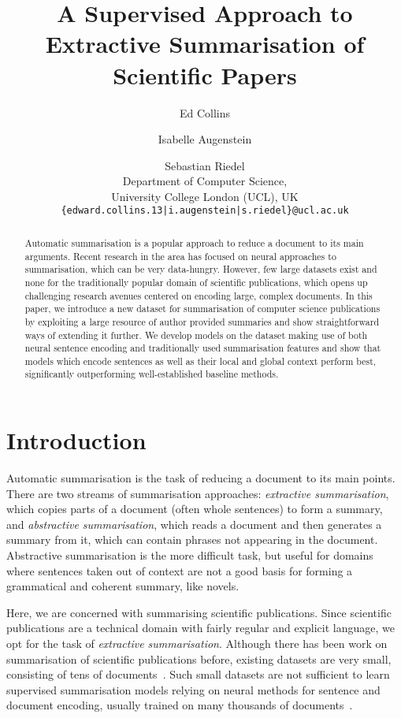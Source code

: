 \documentclass[11pt,a4paper]{article}
\title{A Supervised Approach to Extractive Summarisation of Scientific Papers}
\author{Ed Collins \and Isabelle Augenstein \and Sebastian Riedel \\
  Department of Computer Science,\\ University College London (UCL), UK \\
  {\tt \{edward.collins.13|i.augenstein|s.riedel\}@ucl.ac.uk}}
\date{}
\begin{document}
\maketitle
\begin{abstract}
Automatic summarisation is a popular approach to reduce a document to its main arguments. Recent research in the area has focused on neural approaches to summarisation, which can be very data-hungry. However, few large datasets exist and none for the traditionally popular domain of scientific publications, which opens up challenging research avenues centered on encoding large, complex documents. In this paper, we introduce a new dataset for summarisation of computer science publications by exploiting a large resource of author provided summaries and show straightforward ways of extending it further. We develop models on the dataset making use of both neural sentence encoding and traditionally used summarisation features and show that models which encode sentences as well as their local and global context perform best, significantly outperforming well-established baseline methods. %
\end{abstract}

\section{Introduction}

Automatic summarisation is the task of reducing a document to its main points. There are two streams of summarisation approaches: \textit{extractive summarisation}, which copies parts of a document (often whole sentences) to form a summary, and \textit{abstractive summarisation}, which reads a document and then generates a summary from it, which can contain phrases not appearing in the document.
Abstractive summarisation is the more difficult task, but useful for domains where sentences taken out of context are not a good basis for forming a grammatical and coherent summary, like novels.

Here, we are concerned with summarising scientific publications. Since scientific publications are a technical domain with fairly regular and explicit language, we opt for the task of \textit{extractive summarisation}. Although there has been work on summarisation of scientific publications before, existing datasets are very small, consisting of tens of documents~\cite{kupiec1995trainable,Visser2009}. 
Such small datasets are not sufficient to learn supervised summarisation models relying on neural methods for sentence and document encoding, usually trained on many thousands of documents~\cite{rush-chopra-weston:2015:EMNLP,cheng-lapata:2016:P16-1,chopra-auli-rush:2016:N16-1,see2017get}.
\end{document}
